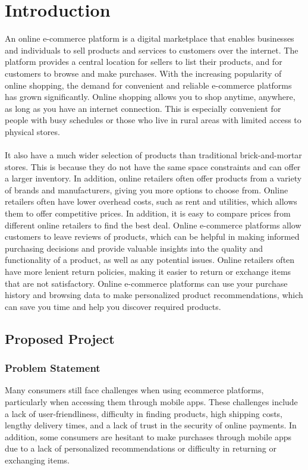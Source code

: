 \documentclass[11pt]{report}
\begin{document}
\chapter {Introduction}
\label{intro}
An online e-commerce platform is a digital marketplace that enables businesses and individuals to sell products and services to customers over the internet. The platform provides a central location for sellers to list their products, and for customers to browse and make purchases. With the increasing popularity of online shopping, the demand for convenient and reliable e-commerce platforms has grown significantly. Online shopping allows you to shop anytime, anywhere, as long as you have an internet connection. This is especially convenient for people with busy schedules or those who live in rural areas with limited access to physical stores.\\
\\It also have a much wider selection of products than traditional brick-and-mortar stores. This is because they do not have the same space constraints and can offer a larger inventory. In addition, online retailers often offer products from a variety of brands and manufacturers, giving you more options to choose from. Online retailers often have lower overhead costs, such as rent and utilities, which allows them to offer competitive prices. In addition, it is easy to compare prices from different online retailers to find the best deal. Online e-commerce platforms allow customers to leave reviews of products, which can be helpful in making informed purchasing decisions and provide valuable insights into the quality and functionality of a product, as well as any potential issues. Online retailers often have more lenient return policies, making it easier to return or exchange items that are not satisfactory.  Online e-commerce platforms can use your purchase history and browsing data to make personalized product recommendations, which can save you time and help you discover required products.

\section{Proposed Project}
\subsection{\label{ps}Problem Statement}
Many consumers still face challenges when using ecommerce platforms, particularly when accessing them through mobile apps. These challenges include a lack of user-friendliness, difficulty in finding products, high shipping costs, lengthy delivery times, and a lack of trust in the security of online payments. In addition, some consumers are hesitant to make purchases through mobile apps due to a lack of personalized recommendations or difficulty in returning or exchanging items.
\end{document}
